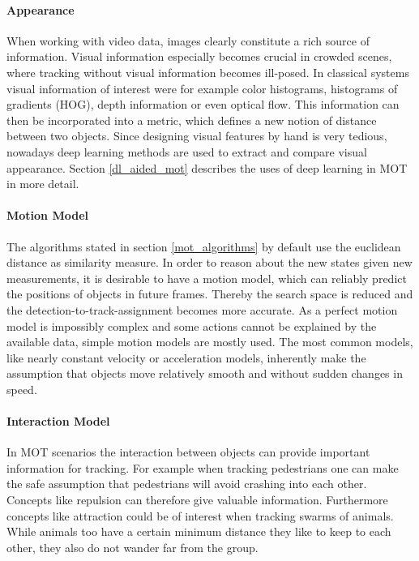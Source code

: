 \documentclass[12pt,a4paper]{article}
\begin{document}
\paragraph{Appearance} When working with video data, images clearly constitute a rich source of information. Visual information especially becomes crucial in crowded scenes, where tracking without visual information becomes ill-posed. In classical systems visual information of interest were for example color histograms, histograms of gradients (HOG), depth information or even optical flow. This information can then be incorporated into a metric, which defines a new notion of distance between two objects. Since designing visual features by hand is very tedious, nowadays deep learning methods are used to extract and compare visual appearance. Section \ref{dl_aided_mot} describes the uses of deep learning in MOT in more detail. 

\paragraph{Motion Model} The algorithms stated in section \ref{mot_algorithms} by default use the euclidean distance as similarity measure. In order to reason about the new states given new measurements, it is desirable to have a motion model, which can reliably predict the positions of objects in future frames. Thereby the search space is reduced and the detection-to-track-assignment becomes more accurate. As a perfect motion model is impossibly complex and some actions cannot be explained by the available data, simple motion models are mostly used. The most common models, like nearly constant velocity or acceleration models, inherently make the assumption that objects move relatively smooth and without sudden changes in speed.

\paragraph{Interaction Model} In MOT scenarios the interaction between objects can provide important information for tracking. For example when tracking pedestrians one can make the safe assumption that pedestrians will avoid crashing into each other. Concepts like repulsion can therefore give valuable information. Furthermore concepts like attraction could be of interest when tracking swarms of animals. While animals too have a certain minimum distance they like to keep to each other, they also do not wander far from the group.
\end{document}
